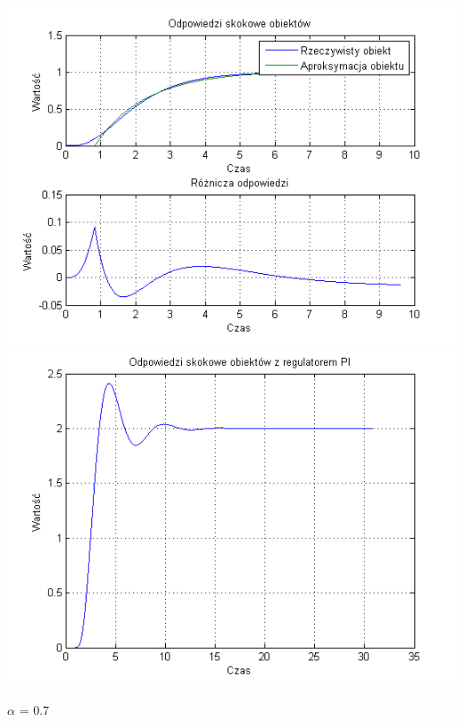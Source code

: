 \documentclass[10pt,a4paper]{article}
\begin{document}
\begin{center}
\includegraphics[scale=1]{images/jeden/skrypt_127.png}\\
\includegraphics[scale=1]{images/jeden/skrypt_128.png}\\
\end{center}
\newpage
$\alpha$ = 0.7
\end{document}
